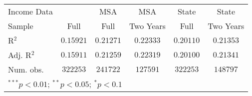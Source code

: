 \begin{tabular}{l c c c c c}
Income Data          &                  & MSA              & MSA              & State            & State            \\
Sample               & Full             & Full             & Two Years        & Full             & Two Years        \\
R$^2$                & $0.15921$        & $0.21271$        & $0.22333$        & $0.20110$        & $0.21353$        \\
Adj. R$^2$           & $0.15911$        & $0.21259$        & $0.22319$        & $0.20100$        & $0.21341$        \\
Num. obs.            & $322253$         & $241722$         & $127591$         & $322253$         & $148797$         \\
\hline
\multicolumn{6}{l}{\scriptsize{$^{***}p<0.01$; $^{**}p<0.05$; $^{*}p<0.1$}}
\end{tabular}
